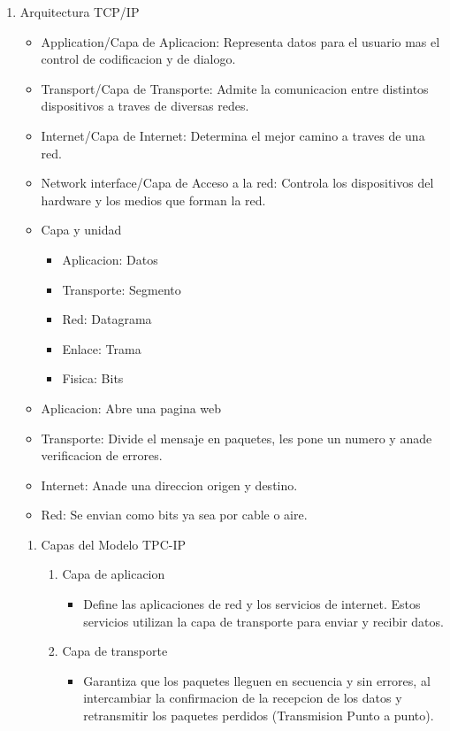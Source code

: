 \documentclass[11pt]{article}
\begin{document}
\begin{enumerate}
\begin{enumerate}
\begin{enumerate}
\begin{itemize}
\begin{enumerate}
\item 49152 - 65535: Puertos privados/dinamicos
\end{enumerate}
\end{itemize}
\item Arquitectura TCP/IP
\label{sec:org45f0b5b}
\begin{itemize}
\item Application/Capa de Aplicacion: Representa datos para el usuario mas el control de codificacion y de dialogo.
\item Transport/Capa de Transporte: Admite la comunicacion entre distintos dispositivos a traves de diversas redes.
\item Internet/Capa de Internet: Determina el mejor camino a traves de una red.
\item Network interface/Capa de Acceso a la red: Controla los dispositivos del hardware y los medios que forman la red.

\item Capa y unidad
\begin{itemize}
\item Aplicacion: Datos
\item Transporte: Segmento
\item Red: Datagrama
\item Enlace: Trama
\item Fisica: Bits
\end{itemize}

\item Aplicacion: Abre una pagina web
\item Transporte: Divide el mensaje en paquetes, les pone un numero y anade verificacion de errores.
\item Internet: Anade una direccion origen y destino.
\item Red: Se envian como bits ya sea por cable o aire.
\end{itemize}
\begin{enumerate}
\item Capas del Modelo TPC-IP
\label{sec:org19f05f0}
\begin{enumerate}
\item Capa de aplicacion
\begin{itemize}
\item Define las aplicaciones de red y los servicios de internet. Estos servicios utilizan la capa de transporte para enviar y recibir datos.
\end{itemize}

\item Capa de transporte
\begin{itemize}
\item Garantiza que los paquetes lleguen en secuencia y sin errores, al intercambiar la confirmacion de la recepcion de los datos y retransmitir los paquetes perdidos (Transmision Punto a punto).
\end{itemize}


\end{enumerate}
\end{enumerate}
\end{enumerate}
\end{enumerate}
\end{enumerate}
\end{document}
